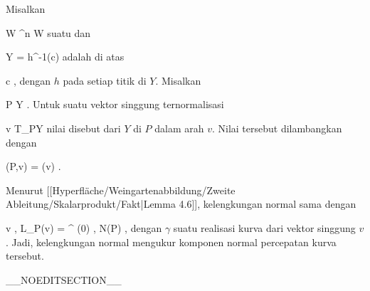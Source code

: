 {}
{

Misalkan

\mavergleichskette
{\vergleichskette
{ W
}
{ \subseteq }{ \R^n
}
{  }{
}
{    }{
}
{   }{
}
}
{}{}{}
 { W } { \R
} {}
suatu
dan

\mavergleichskette
{\vergleichskette
{ Y
}
{ = }{ h^{-1}(c)
}
{  }{
}
{    }{
}
{   }{
}
}
{}{}{}
adalah
di atas

\mavergleichskette
{\vergleichskette
{ c
}
{ \in }{ \R
}
{  }{
}
{    }{
}
{   }{
}
}
{}{}{,}
dengan $h$
pada setiap titik di $Y$. Misalkan

\mavergleichskette
{\vergleichskette
{ P
}
{ \in }{ Y
}
{  }{
}
{    }{
}
{   }{
}
}
{}{}{.}
Untuk suatu vektor singgung ternormalisasi

\mavergleichskette
{\vergleichskette
{ v
}
{ \in }{ T_PY
}
{  }{
}
{    }{
}
{   }{
}
}
{}{}{}
nilai
 disebut
dari $Y$ di $P$ dalam arah $v$. Nilai tersebut dilambangkan dengan

\mavergleichskette
{\vergleichskette
{ \kappa(P,v)
}
{ = }{ \kappa(v)
}
{  }{
}
{    }{
}
{   }{
}
}
{}{}{}
.

}

Menurut
[[Hyperfläche/Weingartenabbildung/Zweite Ableitung/Skalarprodukt/Fakt|Lemma 4.6]],
kelengkungan normal sama dengan

\mavergleichskettedisp
{\vergleichskette
{ \left\langle  v  ,  L_P(v)  \right\rangle
}
{ =} { \left\langle  \gamma^{\prime \prime} (0)  ,  N(P)  \right\rangle
}
{ } {
}
{ } {
}
{ } {
}
}
{}{}{,}
dengan $\gamma$ suatu realisasi kurva dari vektor singgung $v$. Jadi, kelengkungan normal mengukur komponen normal percepatan kurva tersebut.

__NOEDITSECTION__

